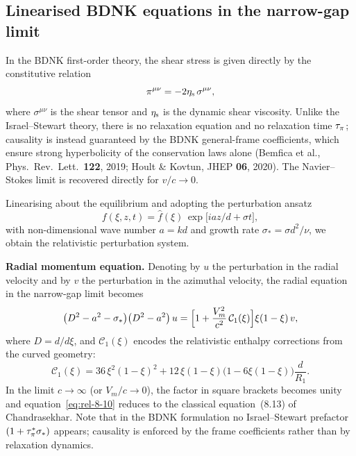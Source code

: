 \subsection{Linearised BDNK equations in the narrow-gap limit}
\label{sec:rel-76-lin}

In the BDNK first-order theory, the shear stress is given directly by
the constitutive relation
\begin{equation}
\label{eq:rel-8-BDNK}
\pi^{\mu\nu} = -2\eta_{\mathrm{s}}\,\sigma^{\mu\nu},
\end{equation}
where $\sigma^{\mu\nu}$ is the shear tensor and $\eta_{\mathrm{s}}$ is the
dynamic shear viscosity.  Unlike the Israel--Stewart theory, there is no
relaxation equation and no relaxation time $\tau_{\pi}$; causality is
instead guaranteed by the BDNK general-frame coefficients, which ensure
strong hyperbolicity of the conservation laws alone
(Bemfica et al., Phys.\ Rev.\ Lett.\ \textbf{122}, 2019;
Hoult \& Kovtun, JHEP \textbf{06}, 2020).
The Navier--Stokes limit is recovered directly for $v/c \to 0$.

Linearising about the equilibrium and adopting the perturbation ansatz
\begin{equation}
\label{eq:rel-8-4}
f(\xi, z, t) = \hat{f}(\xi)\,\exp\bigl[i a z/d + \sigma t\bigr],
\end{equation}
with non-dimensional wave number $a = kd$ and growth rate
$\sigma_* = \sigma d^2/\nu$, we obtain the relativistic perturbation
system.

\medskip
\noindent\textbf{Radial momentum equation.}
Denoting by $u$ the perturbation in the radial velocity and by $v$ the
perturbation in the azimuthal velocity, the radial equation in the
narrow-gap limit becomes
\begin{equation}
\label{eq:rel-8-10}
\bigl(D^2 - a^2 - \sigma_*\bigr)
\bigl(D^2 - a^2\bigr)\,u
= \Bigl[1 + \frac{V_m^2}{c^2}\,\mathcal{C}_1(\xi)\Bigr]
  \xi(1 - \xi)\, v,
\end{equation}
where $D = d/d\xi$, and $\mathcal{C}_1(\xi)$ encodes the relativistic
enthalpy corrections from the curved geometry:
\begin{equation}
\label{eq:rel-8-C1}
\mathcal{C}_1(\xi) = 36\,\xi^2(1-\xi)^2
  + 12\,\xi(1-\xi)\bigl(1 - 6\xi(1-\xi)\bigr)\frac{d}{R_1}.
\end{equation}
In the limit $c \to \infty$ (or $V_m/c \to 0$), the factor in square
brackets becomes unity and equation~\eqref{eq:rel-8-10} reduces to the
classical equation~(8.13) of Chandrasekhar.  Note that in the BDNK
formulation no Israel--Stewart prefactor $(1 + \tau_{\pi}^*\sigma_*)$ appears;
causality is enforced by the frame coefficients rather than by
relaxation dynamics.

